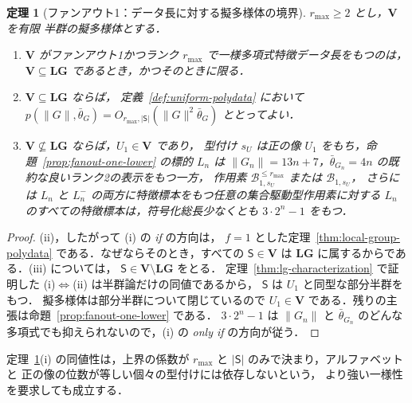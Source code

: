 \documentclass[11pt,a4paper]{ltjsarticle}
\numberwithin{equation}{section}
\theoremstyle{plain}
\newtheorem{theorem}{定理}[section]
\theoremstyle{definition}
\theoremstyle{remark}
\theoremstyle{plain}
\begin{document}
\begin{theorem}[ファンアウト1：データ長に対する擬多様体の境界]
\label{thm:fanout-one-data}
$r_{\max}\ge2$ とし，$\mathbf V$ を有限
半群の擬多様体とする．
\begin{enumerate}[label=\textup{(\roman*)},leftmargin=*]
\item $\mathbf V$ がファンアウト1かつランク $r_{\max}$ で一様多項式特徴データ長をもつのは，
$\mathbf V\subseteq\mathbf{LG}$ であるとき，かつそのときに限る．
\item $\mathbf V\subseteq\mathbf{LG}$ ならば，
定義~\ref{def:uniform-polydata} において
$p(\|G\|,\bar\theta_G)=O_{r_{\max},|\mathsf S|}(\|G\|^2\bar\theta_G)$ ととってよい．
\item $\mathbf V\not\subseteq\mathbf{LG}$ ならば，$U_1\in\mathbf V$ であり，
型付け $s_U$ は正の像 $U_1$ をもち，命題~\ref{prop:fanout-one-lower} の標的 $L_n$ は
$\|G_n\|=13n+7$，$\bar\theta_{G_n}=4n$ の既約な良いランク2の表示をもつ一方，
作用素 $\mathcal B^{\le r_{\max}}_{1,s_U}$ または $\mathcal B_{1,s_U}$，
さらには $L_n$ と $L_n^-$ の両方に特徴標本をもつ任意の集合駆動型作用素に対する
$L_n$ のすべての特徴標本は，符号化総長少なくとも $3\cdot2^n-1$ をもつ．
\end{enumerate}
\end{theorem}

\begin{proof}
(ii)，したがって (i) の \emph{if} の方向は，
$f=1$ とした定理~\ref{thm:local-group-polydata} である．なぜならそのとき，すべての
$\mathsf S\in\mathbf V$ は $\mathbf{LG}$ に属するからである．(iii) については，
$\mathsf S\in\mathbf V\setminus\mathbf{LG}$ をとる．
定理~\ref{thm:lg-characterization} で証明した
(i)$\Leftrightarrow$(ii) は半群論だけの同値であるから，
$\mathsf S$ は $U_1$ と同型な部分半群をもつ．
擬多様体は部分半群について閉じているので $U_1\in\mathbf V$ である．残りの主張は命題~\ref{prop:fanout-one-lower} である．
$3\cdot2^n-1$ は $\|G_n\|$ と
$\bar\theta_{G_n}$ のどんな多項式でも抑えられないので，(i) の \emph{only if} の方向が従う．
\end{proof}

定理~\ref{thm:fanout-one-data}(i) の同値性は，上界の係数が
$r_{\max}$ と $|\mathsf S|$ のみで決まり，アルファベットと
正の像の位数が等しい個々の型付けには依存しないという，
より強い一様性を要求しても成立する．
\end{document}
